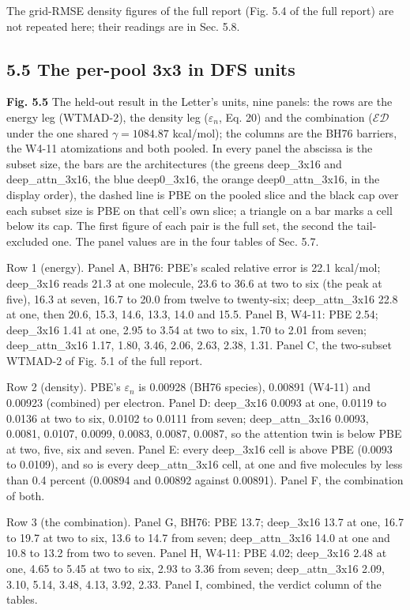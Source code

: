 \documentclass[10pt,a4paper]{article}
\begin{document}
The grid-RMSE density figures of the full report (Fig. 5.4 of the full report) are not repeated here; their readings are in Sec. 5.8.

\subsection*{5.5 The per-pool 3x3 in DFS units}

\textbf{Fig. 5.5} The held-out result in the Letter's units, nine panels: the rows are the energy leg (WTMAD-2), the density leg ($\varepsilon_n$, Eq. 20) and the combination ($\mathcal{ED}$ under the one shared $\gamma = 1084.87$ kcal/mol); the columns are the BH76 barriers, the W4-11 atomizations and both pooled. In every panel the abscissa is the subset size, the bars are the architectures (the greens deep\_3x16 and deep\_attn\_3x16, the blue deep0\_3x16, the orange deep0\_attn\_3x16, in the display order), the dashed line is PBE on the pooled slice and the black cap over each subset size is PBE on that cell's own slice; a triangle on a bar marks a cell below its cap. The first figure of each pair is the full set, the second the tail-excluded one. The panel values are in the four tables of Sec. 5.7.

Row 1 (energy). Panel A, BH76: PBE's scaled relative error is 22.1 kcal/mol; deep\_3x16 reads 21.3 at one molecule, 23.6 to 36.6 at two to six (the peak at five), 16.3 at seven, 16.7 to 20.0 from twelve to twenty-six; deep\_attn\_3x16 22.8 at one, then 20.6, 15.3, 14.6, 13.3, 14.0 and 15.5. Panel B, W4-11: PBE 2.54; deep\_3x16 1.41 at one, 2.95 to 3.54 at two to six, 1.70 to 2.01 from seven; deep\_attn\_3x16 1.17, 1.80, 3.46, 2.06, 2.63, 2.38, 1.31. Panel C, the two-subset WTMAD-2 of Fig. 5.1 of the full report.

Row 2 (density). PBE's $\varepsilon_n$ is 0.00928 (BH76 species), 0.00891 (W4-11) and 0.00923 (combined) per electron. Panel D: deep\_3x16 0.0093 at one, 0.0119 to 0.0136 at two to six, 0.0102 to 0.0111 from seven; deep\_attn\_3x16 0.0093, 0.0081, 0.0107, 0.0099, 0.0083, 0.0087, 0.0087, so the attention twin is below PBE at two, five, six and seven. Panel E: every deep\_3x16 cell is above PBE (0.0093 to 0.0109), and so is every deep\_attn\_3x16 cell, at one and five molecules by less than 0.4 percent (0.00894 and 0.00892 against 0.00891). Panel F, the combination of both.

Row 3 (the combination). Panel G, BH76: PBE 13.7; deep\_3x16 13.7 at one, 16.7 to 19.7 at two to six, 13.6 to 14.7 from seven; deep\_attn\_3x16 14.0 at one and 10.8 to 13.2 from two to seven. Panel H, W4-11: PBE 4.02; deep\_3x16 2.48 at one, 4.65 to 5.45 at two to six, 2.93 to 3.36 from seven; deep\_attn\_3x16 2.09, 3.10, 5.14, 3.48, 4.13, 3.92, 2.33. Panel I, combined, the verdict column of the tables.
\end{document}

